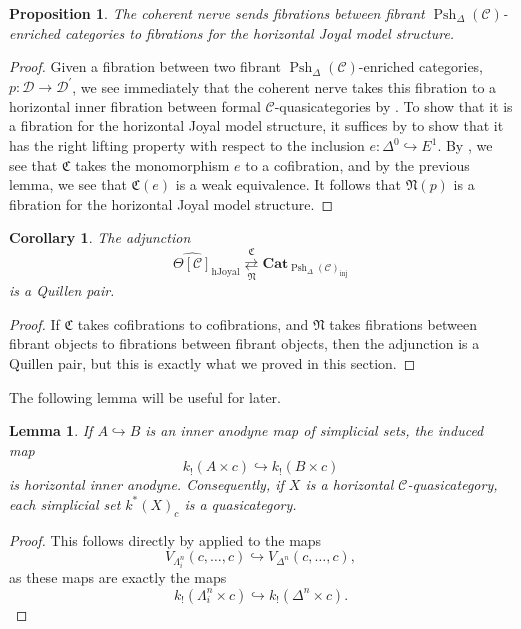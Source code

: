 \documentclass[a4paper]{article}
\numberwithin{equation}{subsection}
\theoremstyle{plain}   %
\newtheorem{prop}[equation]{Proposition}
\newtheorem{cor}[equation]{Corollary}
\newtheorem{lemma}[equation]{Lemma}
\theoremstyle{definition}
\theoremstyle{remark}
\theoremstyle{plain}
\newcommand{\Cat}{\ensuremath{\mathbf{Cat}}}
\providecommand{\C}{}
\renewcommand{\C}{\ensuremath{\mathcal{C}}}
\newcommand{\cellset}{\ensuremath{\widehat{\Theta[\mathcal{C}]}}}
\newcommand{\spsh}{\ensuremath{\operatorname{Psh}_\Delta(\mathcal{C})}}
\begin{document}
\begin{prop}
	The coherent nerve sends fibrations between fibrant \(\spsh\)-enriched categories to fibrations for the horizontal Joyal model structure.
\end{prop}
\begin{proof}
	Given a fibration between two fibrant \(\spsh\)-enriched categories, \(p:\mathcal{D}\to \mathcal{D}^\prime\), we see immediately that the coherent nerve takes this fibration to a horizontal inner fibration between formal \(\C\)-quasicategories by .  To show that it is a fibration for the horizontal Joyal model structure, it suffices by  to show that it has the right lifting property with respect to the inclusion \(e:\Delta^0 \hookrightarrow E^1\). By , we see that \(\mathfrak{C}\) takes the monomorphism \(e\) to a cofibration, and by the previous lemma, we see that \(\mathfrak{C}(e)\) is a weak equivalence.  It follows that \(\mathfrak{N}(p)\) is a fibration for the horizontal Joyal model structure.
\end{proof}

\begin{cor}\label{horizquillen}
	The adjunction 
	\[\cellset_{\mathrm{hJoyal}} \underset{\mathfrak{N}}{\overset{\mathfrak{C}}{\rightleftarrows}} \Cat_{\spsh_{\mathrm{inj}}}\]
	is a Quillen pair.
\end{cor}
\begin{proof}
	If \(\mathfrak{C}\) takes cofibrations to cofibrations, and \(\mathfrak{N}\) takes fibrations between fibrant objects to fibrations between fibrant objects, then the adjunction is a Quillen pair, but this is exactly what we proved in this section.
\end{proof}

The following lemma will be useful for later.
\begin{lemma}\label{precatanodyne}
	If \(A\hookrightarrow B\) is an inner anodyne map of simplicial sets, the induced map
	\[k_!(A\times c) \hookrightarrow k_!(B\times c)\] is horizontal inner anodyne. Consequently, if \(X\) is a horizontal \(\C\)-quasicategory, each simplicial set \(k^\ast(X)_c\) is a quasicategory. 
\end{lemma}
\begin{proof}
	This follows directly by  applied to the maps
	\[V_{\Lambda^n_i}(c,\dots,c) \hookrightarrow V_{\Delta^n}(c,\dots,c),\] as these maps are exactly the maps
	\[k_!(\Lambda^n_i\times c) \hookrightarrow k_!(\Delta^n \times c).\]
\end{proof}
\end{document}
